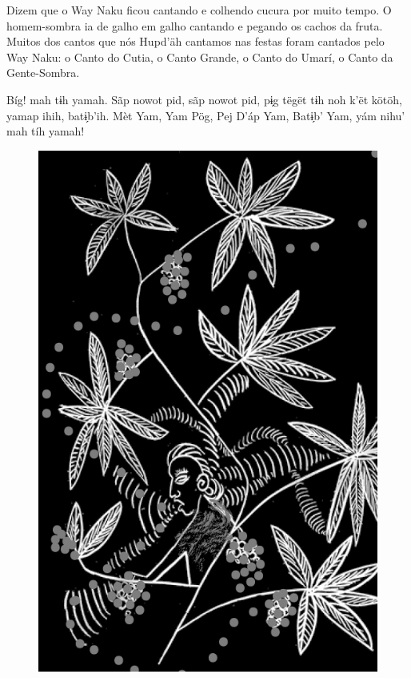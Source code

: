\mbox{}\vspace*{\fill}

Dizem que o Way Naku ficou
cantando e colhendo cucura
por muito tempo. O homem-sombra ia de galho em galho
cantando e pegando os cachos
da fruta. Muitos dos cantos
que nós Hupd’äh cantamos nas
festas foram cantados pelo Way
Naku: o Canto do Cutia, o Canto
Grande, o Canto do Umarí, o
Canto da Gente-Sombra.

\bigskip

Bíg! mah tɨh yamah. Sãp nowot
pid, sãp nowot pid, pɨ̗g tëgët
tɨh noh k’ët kötöh, yamap ihih,
batɨ̗b’ih. Mèt Yam, Yam Pög, Pej
D’áp Yam, Batɨ̗b’ Yam, yám nihu’
mah tíh yamah!

\vspace*{\fill}

\begin{figure}
\vspace*{-1.2cm}
\hspace*{-2.2cm}\includegraphics[width=138mm]{./imgs/img3.jpg}
\end{figure}

